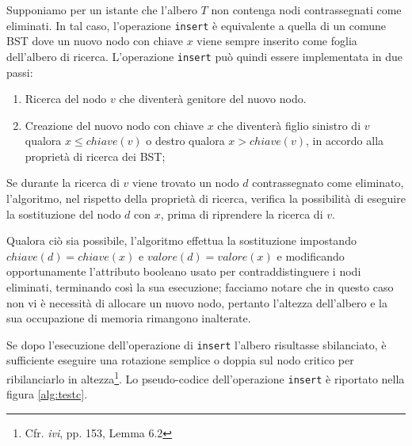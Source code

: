 \documentclass[10pt,a4paper,titlepage]{article}
\begin{document}
Supponiamo per un istante che l'albero $T$ non contenga nodi contrassegnati come eliminati. In tal caso, l'operazione \texttt{insert} è equivalente a quella di un comune BST dove un nuovo nodo con chiave $x$ viene sempre inserito come foglia dell'albero di ricerca. L'operazione \texttt{insert} può quindi essere implementata in due passi:

\begin{enumerate}
\item Ricerca del nodo $v$ che diventerà genitore del nuovo nodo.
\item Creazione del nuovo nodo con chiave $x$ che diventerà figlio sinistro di $v$ qualora $ x \leqslant chiave(v)$ o destro qualora $ x > chiave(v)$, in accordo alla proprietà di ricerca dei BST;
\end{enumerate}

Se durante la ricerca di $v$ viene trovato un nodo $d$ contrassegnato come eliminato, l'algoritmo, nel rispetto della proprietà di ricerca, verifica la possibilità di eseguire la sostituzione del nodo $d$ con $x$, prima di riprendere la ricerca di $v$.

Qualora ciò sia possibile, l'algoritmo effettua la sostituzione impostando $chiave(d) = chiave(x)$ e $valore(d) = valore(x)$ e modificando opportunamente l'attributo booleano usato per contraddistinguere i nodi eliminati, terminando così la sua esecuzione; facciamo notare che in questo caso non vi è necessità di allocare un nuovo nodo, pertanto l'altezza dell'albero e la sua occupazione di memoria rimangono inalterate.

Se dopo l'esecuzione dell'operazione di \texttt{insert} l'albero risultasse sbilanciato, è sufficiente eseguire una rotazione semplice o doppia sul nodo critico per ribilanciarlo in altezza\footnote{Cfr. \textit{ivi}, pp. 153, Lemma 6.2}. Lo pseudo-codice dell'operazione \texttt{insert} è riportato nella figura \ref{alg:testc}.
\end{document}
